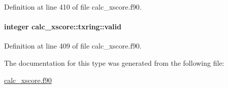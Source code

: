 Definition at line 410 of file calc\-\_\-xscore.\-f90.

\hypertarget{structcalc__xscore_1_1txring_a01f6d01b46aa0beb306b48cfafe51bcf}{
\paragraph[{valid}]{\setlength{\rightskip}{0pt plus 5cm}integer calc\-\_\-xscore\-::txring\-::valid}}\label{structcalc__xscore_1_1txring_a01f6d01b46aa0beb306b48cfafe51bcf}


Definition at line 409 of file calc\-\_\-xscore.\-f90.



The documentation for this type was generated from the following file\-:\begin{DoxyCompactItemize}
\item 
\hyperlink{calc__xscore_8f90}{calc\-\_\-xscore.\-f90}\end{DoxyCompactItemize}
